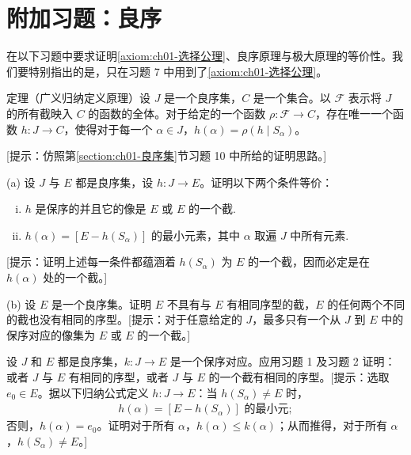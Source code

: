\documentclass[../../main.tex]{subfiles}
\begin{document}
\section*{附加习题：良序}\label{section:ch01-附加习题良序}

在以下习题中要求证明\cref{axiom:ch01-选择公理}、良序原理与极大原理的等价性。我们要特别指出的是，只在习题 7 中用到了\cref{axiom:ch01-选择公理}。

\begin{exercise}\label{exercise:ch01-附加良序-1}
定理（广义归纳定义原理）设 $J$ 是一个良序集，$C$ 是一个集合。以 $\mathcal{F}$ 表示将 $J$ 的所有截映入 $C$ 的函数的全体。对于给定的一个函数 $\rho: \mathcal{F} \longrightarrow C$，存在唯一一个函数 $h: J \longrightarrow C$，使得对于每一个 $\alpha \in J$，$h(\alpha) = \rho(h \mid S_{\alpha})$。

[提示：仿照第\cref{section:ch01-良序集}节习题 10 中所给的证明思路。]
\end{exercise}

\begin{exercise}\label{exercise:ch01-附加良序-2}
(a) 设 $J$ 与 $E$ 都是良序集，设 $h: J \longrightarrow E$。证明以下两个条件等价：
\begin{enumerate}[(i)]
\item $h$ 是保序的并且它的像是 $E$ 或 $E$ 的一个截.
\item $h(\alpha) = [E - h(S_{\alpha})]$ 的最小元素，其中 $\alpha$ 取遍 $J$ 中所有元素.
\end{enumerate}
[提示：证明上述每一条件都蕴涵着 $h(S_{\alpha})$ 为 $E$ 的一个截，因而必定是在 $h(\alpha)$ 处的一个截。]

(b) 设 $E$ 是一个良序集。证明 $E$ 不具有与 $E$ 有相同序型的截，$E$ 的任何两个不同的截也没有相同的序型。[提示：对于任意给定的 $J$，最多只有一个从 $J$ 到 $E$ 中的保序对应的像集为 $E$ 或 $E$ 的一个截。]
\end{exercise}

\begin{exercise}\label{exercise:ch01-附加良序-3}
设 $J$ 和 $E$ 都是良序集，$k: J \longrightarrow E$ 是一个保序对应。应用习题 1 及习题 2 证明：或者 $J$ 与 $E$ 有相同的序型，或者 $J$ 与 $E$ 的一个截有相同的序型。[提示：选取 $e_{0} \in E$。据以下归纳公式定义 $h: J \longrightarrow E$：当 $h(S_{\alpha}) \neq E$ 时，
\begin{align*}
h(\alpha) = [E - h(S_{\alpha})] \text{ 的最小元};
\end{align*}
否则，$h(\alpha) = e_{0}$。证明对于所有 $\alpha$，$h(\alpha) \leqslant k(\alpha)$；从而推得，对于所有 $\alpha$，$h(S_{\alpha}) \neq E$。]
\end{exercise}
\end{document}
